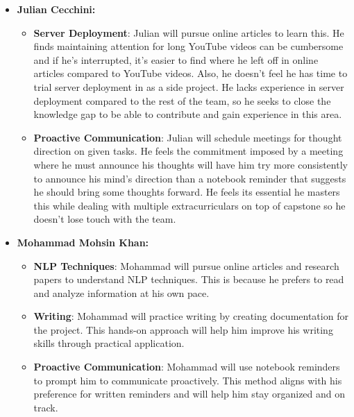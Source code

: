 \documentclass[12pt]{article}
\begin{document}
\begin{enumerate}
\begin{itemize}
        \item \textbf{Julian Cecchini:} 
        \begin{itemize}
            \item \textbf{Server Deployment}: Julian will pursue online articles to learn this. He finds maintaining attention for long YouTube videos can be cumbersome and if he's interrupted, it's easier to find where he left off in online articles compared to YouTube videos. Also, he doesn't feel he has time to trial server deployment in as a side project. He lacks experience in server deployment compared to the rest of the team, so he seeks to close the knowledge gap to be able to contribute and gain experience in this area.

            \item \textbf{Proactive Communication}: Julian will schedule meetings for thought direction on given tasks. He feels the commitment imposed by a meeting where he must announce his thoughts will have him try more consistently to announce his mind's direction than a notebook reminder that suggests he should bring some thoughts forward. He feels its essential he masters this while dealing with multiple extracurriculars on top of capstone so he doesn't lose touch with the team.
        \end{itemize}

        \item \textbf{Mohammad Mohsin Khan:}
        \begin{itemize}
            \item \textbf{NLP Techniques}: Mohammad will pursue online articles and research papers to understand NLP techniques. This is because he prefers to read and analyze information at his own pace.
            \item \textbf{Writing}: Mohammad will practice writing by creating documentation for the project. This hands-on approach will help him improve his writing skills through practical application.
            \item \textbf{Proactive Communication}: Mohammad will use notebook reminders to prompt him to communicate proactively. This method aligns with his preference for written reminders and will help him stay organized and on track.
        \end{itemize}
        

\end{itemize}
\end{enumerate}
\end{document}

